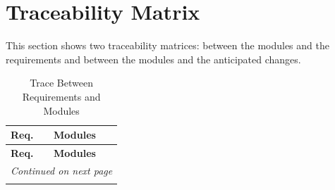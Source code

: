 \documentclass[12pt, titlepage]{article}
\begin{document}
\section{Traceability Matrix} \label{SecTM}

This section shows two traceability matrices: between the modules and the
requirements and between the modules and the anticipated changes.

\begin{longtable}{p{} p{}}
\caption{Trace Between Requirements and Modules} \label{TblRT} \\

\toprule
\textbf{Req.} & \textbf{Modules} \\
\midrule
\endfirsthead

\toprule
\textbf{Req.} & \textbf{Modules} \\
\midrule
\endhead

\midrule
\multicolumn{2}{r}{\textit{Continued on next page}} \\
\midrule
\endfoot

\bottomrule
\endlastfoot


\end{longtable}
\end{document}
